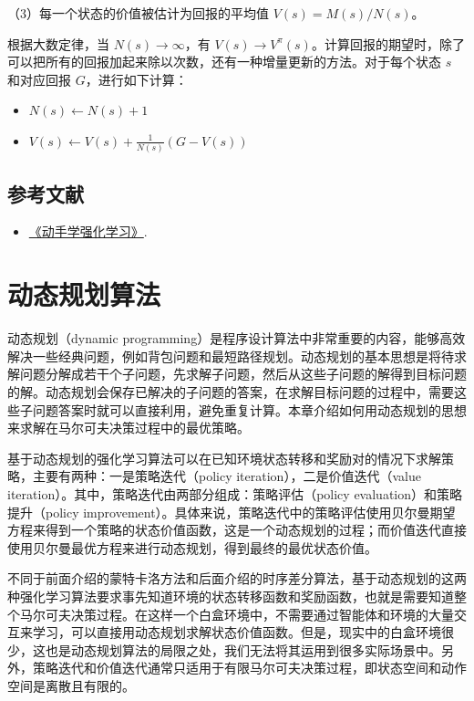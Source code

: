 （3）每一个状态的价值被估计为回报的平均值 \(V(s)=M(s)/N(s)\)。

根据大数定律，当 \(N(s)\to\infty\)，有 \(V(s)\to V^\pi(s)\)。计算回报的期望时，除了可以把所有的回报加起来除以次数，还有一种增量更新的方法。对于每个状态 \(s\) 和对应回报 \(G\)，进行如下计算：

\begin{itemize}
\tightlist
\item
  \(N(s)\leftarrow N(s)+1\)
\item
  \(V(s)\leftarrow V(s)+\frac{1}{N(s)}(G-V(s))\)
\end{itemize}

\hypertarget{ux53c2ux8003ux6587ux732e-46}{%
\subsection{参考文献}\label{ux53c2ux8003ux6587ux732e-46}}

\vspace{0.25em}
\begin{itemize}
\tightlist
\item
  \href{https://hrl.boyuai.com/}{《动手学强化学习》}.
\end{itemize}

\clearpage

\hypertarget{ux52a8ux6001ux89c4ux5212ux7b97ux6cd5}{%
\section{动态规划算法}\label{ux52a8ux6001ux89c4ux5212ux7b97ux6cd5}}

动态规划（dynamic programming）是程序设计算法中非常重要的内容，能够高效解决一些经典问题，例如背包问题和最短路径规划。动态规划的基本思想是将待求解问题分解成若干个子问题，先求解子问题，然后从这些子问题的解得到目标问题的解。动态规划会保存已解决的子问题的答案，在求解目标问题的过程中，需要这些子问题答案时就可以直接利用，避免重复计算。本章介绍如何用动态规划的思想来求解在马尔可夫决策过程中的最优策略。

基于动态规划的强化学习算法可以在已知环境状态转移和奖励对的情况下求解策略，主要有两种：一是策略迭代（policy iteration），二是价值迭代（value iteration）。其中，策略迭代由两部分组成：策略评估（policy evaluation）和策略提升（policy improvement）。具体来说，策略迭代中的策略评估使用贝尔曼期望方程来得到一个策略的状态价值函数，这是一个动态规划的过程；而价值迭代直接使用贝尔曼最优方程来进行动态规划，得到最终的最优状态价值。

不同于前面介绍的蒙特卡洛方法和后面介绍的时序差分算法，基于动态规划的这两种强化学习算法要求事先知道环境的状态转移函数和奖励函数，也就是需要知道整个马尔可夫决策过程。在这样一个白盒环境中，不需要通过智能体和环境的大量交互来学习，可以直接用动态规划求解状态价值函数。但是，现实中的白盒环境很少，这也是动态规划算法的局限之处，我们无法将其运用到很多实际场景中。另外，策略迭代和价值迭代通常只适用于有限马尔可夫决策过程，即状态空间和动作空间是离散且有限的。

